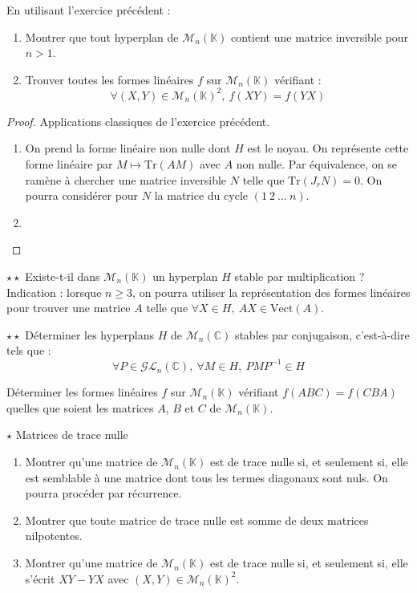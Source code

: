 \documentclass[french,a4paper]{article}
\newcommand{\C}{\mathbb{C}}
\newcommand{\K}{\mathbb{K}}
\newcommand{\inv}{^{-1}}
\newcommand{\Tr}{\text{Tr}}
\theoremstyle{plain}
\theoremstyle{definition}
\theoremstyle{remark}
\begin{document}
\begin{ex}{}
	En utilisant l'exercice précédent :
	\begin{enumerate}
		\item Montrer que tout hyperplan de $\mathcal{M}_n(\K)$ contient une matrice inversible pour $n>1$.
		\item Trouver toutes les formes linéaires $f$ sur $\mathcal{M}_n(\K)$ vérifiant : $$\forall (X,Y)\in\mathcal{M}_n(\K)^2,\ f(XY)=f(YX)$$
	\end{enumerate}
\end{ex}
\begin{proof}
	Applications classiques de l'exercice précédent.
	\begin{enumerate}
		\item On prend la forme linéaire non nulle dont $H$ est le noyau. On représente cette forme linéaire par $M\mapsto\Tr(AM)$ avec $A$ non nulle. Par équivalence, on se ramène à chercher une matrice inversible $N$ telle que $\Tr(J_r N)=0$. On pourra considérer pour $N$ la matrice du cycle $(1\ 2\ \ldots \ n)$.
		\item 
	\end{enumerate}
\end{proof}

\begin{ex}{$\star\star$}
	Existe-t-il dans $\mathcal{M}_n(\K)$ un hyperplan $H$ stable par multiplication ? Indication : lorsque $n\geqslant3$, on pourra utiliser la représentation des formes linéaires pour trouver une matrice $A$ telle que $\forall X\in H,\ AX\in\text{Vect}(A)$.
\end{ex}

\begin{ex}{$\star\star$}
	Déterminer les hyperplans $H$ de $\mathcal{M}_n(\C)$ stables par conjugaison, c'est-à-dire tels que : $$\forall P\in\mathcal{GL}_n(\C),\ \forall M\in H,\ PMP\inv\in H$$
\end{ex}

\begin{ex}{}
	Déterminer les formes linéaires $f$ sur $\mathcal{M}_n(\K)$ vérifiant $f(ABC)=f(CBA)$ quelles que soient les matrices $A$, $B$ et $C$ de $\mathcal{M}_n(\K)$.
\end{ex}

\begin{ex}{$\star$ Matrices de trace nulle}
	\begin{enumerate}
		\item Montrer qu'une matrice de $\mathcal{M}_n(\K)$ est de trace nulle si, et seulement si, elle est semblable à une matrice dont tous les termes diagonaux sont nuls. On pourra procéder par récurrence.
		\item Montrer que toute matrice de trace nulle est somme de deux matrices nilpotentes.
		\item Montrer qu'une matrice de $\mathcal{M}_n(\K)$ est de trace nulle si, et seulement si, elle s'écrit $XY-YX$ avec $(X,Y)\in\mathcal{M}_n(\K)^2$.
	\end{enumerate}
\end{ex}
\end{document}
